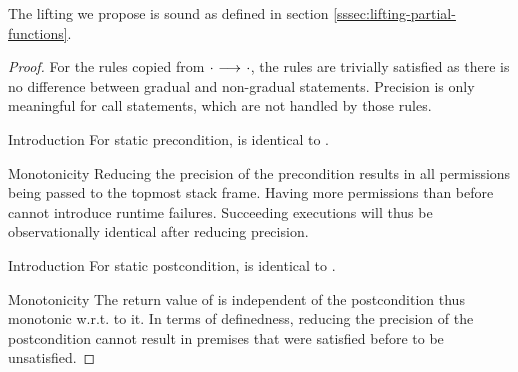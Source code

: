 \begin{lemma}
    The lifting we propose is sound as defined in section \ref{sssec:lifting-partial-functions}.
\end{lemma}
\begin{proof}
    For the rules copied from ${\cdot} \,\,{\longrightarrow^{}}\,\, {\cdot}$, the rules are trivially satisfied as there is no difference between gradual and non-gradual statements.
    Precision is only meaningful for call statements, which are not handled by those rules.

    
        Introduction
        For static precondition,  is identical to .
        
        Monotonicity
        Reducing the precision of the precondition results in all permissions being passed to the topmost stack frame.
        Having more permissions than before cannot introduce runtime failures.
        Succeeding executions will thus be observationally identical after reducing precision.
        
        Introduction
        For static postcondition,  is identical to .
        
        Monotonicity
        The return value of  is independent of the postcondition thus monotonic w.r.t. to it.
        In terms of definedness, reducing the precision of the postcondition cannot result in premises that were satisfied before to be unsatisfied.
\end{proof}